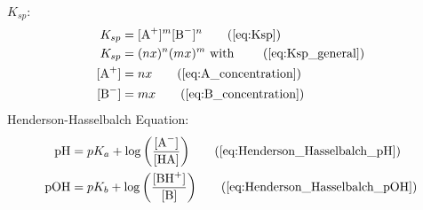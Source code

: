         $K_{sp}$:
        \begin{align}
            K_{sp} &= [\ce{A+}]^m[\ce{B-}]^n \tag{\ref{eq:Ksp}}\\
            K_{sp} &= (nx)^n (mx)^m \text{ with } \tag{\ref{eq:Ksp_general}}\\
            [\ce{A+}] &= nx \tag{\ref{eq:A_concentration}}\\
            [\ce{B-}] &= mx \tag{\ref{eq:B_concentration}}
        \end{align}
        Henderson-Hasselbalch Equation:
        \begin{align}
            \text{pH} &= pK_a + \log{\left(\frac{[\ce{A-}]}{[\ce{HA}]}\right)} \tag{\ref{eq:Henderson_Hasselbalch_pH}}\\
            \text{pOH} &= pK_b + \log{\left(\frac{[\ce{BH+}]}{[\ce{B}]}\right)} \tag{\ref{eq:Henderson_Hasselbalch_pOH}}
        \end{align}
